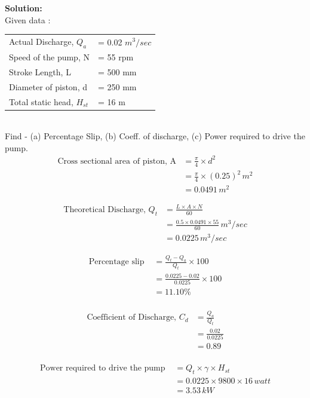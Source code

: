 \documentclass{article}
\begin{document}
\textbf{Solution:}\\
Given data : \\ 
\begin{tabular}{ll}
  Actual Discharge, $Q_a$ & = 0.02 $m^3/sec$ \\
  Speed of the pump, N & = 55 rpm \\
  Stroke Length, L & = 500 mm\\
  Diameter of piston, d & = 250 mm \\
  Total static head, $H_{st}$ & = 16 m\\ 
\end{tabular} \\
Find - (a) Percentage Slip, (b) Coeff. of discharge, (c) Power required to drive the pump.\\

\begin{align*}
  \text{Cross sectional area of piston, A} &= \frac{\pi}{4}  \times d^2 \\
  &= \frac{\pi}{4} \times (0.25)^2 \, m^2 \\
  &= 0.0491 \, m^2
\end{align*}

\begin{align*}
  \text{Theoretical Discharge, } Q_t &= \frac{L \times A \times N}{60}\\
  &= \frac{0.5 \times 0.0491 \times 55}{60} \, m^3/sec \\
  &= 0.0225 \, m^3/sec
\end{align*}

\begin{align*}
  \text{Percentage slip } &= \frac{Q_t - Q_a}{Q_t} \times 100\\
  &= \frac{0.0225 - 0.02}{0.0225} \times 100 \\
  &= 11.10\% \\
\end{align*}

\begin{align*}
  \text{Coefficient of Discharge, } C_d &= \frac{Q_a}{Q_t} \\
  &= \frac{0.02}{0.0225} \\
  &= 0.89 \\
\end{align*}

\begin{align*}
  \text{Power required to drive the pump } &= Q_t \times \gamma \times H_{st}\\
  &= 0.0225 \times 9800 \times 16 \, watt \\
  &= 3.53 \, kW \\
\end{align*}
\hrulefill
\end{document}
